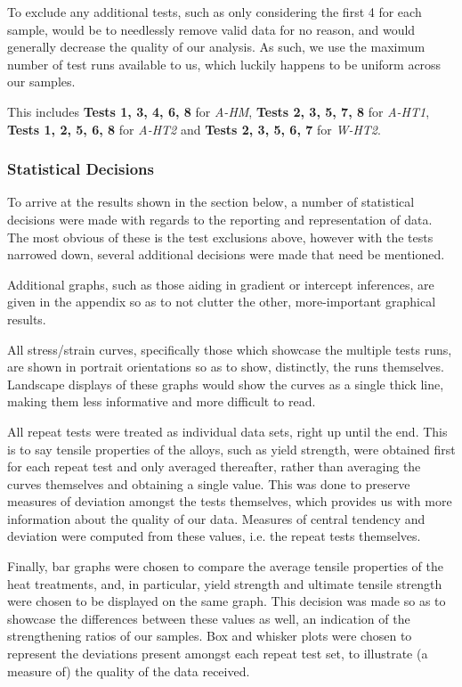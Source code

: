 \documentclass{article}
\begin{document}
To exclude any additional tests, such as only considering the first 4 for each sample, would be to needlessly remove valid data for no reason, and would generally decrease the quality of our analysis. As such, we use the maximum number of test runs available to us, which luckily happens to be uniform across our samples. 

This includes \textbf{Tests 1, 3, 4, 6, 8} for \textit{A-HM}, \textbf{Tests 2, 3, 5, 7, 8} for \textit{A-HT1}, \textbf{Tests 1, 2, 5, 6, 8} for \textit{A-HT2} and \textbf{Tests 2, 3, 5, 6, 7} for \textit{W-HT2}. 


\subsubsection{Statistical Decisions}
To arrive at the results shown in the section below, a number of statistical decisions were made with regards to the reporting and representation of data. The most obvious of these is the test exclusions above, however with the tests narrowed down, several additional decisions were made that need be mentioned. 

Additional graphs, such as those aiding in gradient or intercept inferences, are given in the appendix so as to not clutter the other, more-important graphical results.

All stress/strain curves, specifically those which showcase the multiple tests runs, are shown in portrait orientations so as to show, distinctly, the runs themselves. Landscape displays of these graphs would show the curves as a single thick line, making them less informative and more difficult to read. 

All repeat tests were treated as individual data sets, right up until the end. This is to say tensile properties of the alloys, such as yield strength, were obtained first for each repeat test and only averaged thereafter, rather than averaging the curves themselves and obtaining a single value. This was done to preserve measures of deviation amongst the tests themselves, which provides us with more information about the quality of our data. Measures of central tendency and deviation were computed from these values, i.e. the repeat tests themselves.

Finally, bar graphs were chosen to compare the average tensile properties of the heat treatments, and, in particular, yield strength and ultimate tensile strength were chosen to be displayed on the same graph. This decision was made so as to showcase the differences between these values as well, an indication of the strengthening ratios of our samples. Box and whisker plots were chosen to represent the deviations present amongst each repeat test set, to illustrate (a measure of) the quality of the data received.
\end{document}
